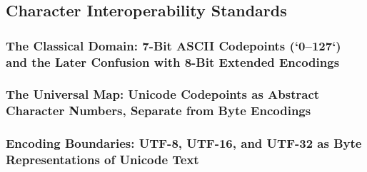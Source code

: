 \subsection{Character Interoperability Standards}
\subsubsection{The Classical Domain: 7-Bit ASCII Codepoints (`0–127`) and the Later Confusion with 8-Bit Extended Encodings}
\subsubsection{The Universal Map: Unicode Codepoints as Abstract Character Numbers, Separate from Byte Encodings}
\subsubsection{Encoding Boundaries: UTF-8, UTF-16, and UTF-32 as Byte Representations of Unicode Text}
